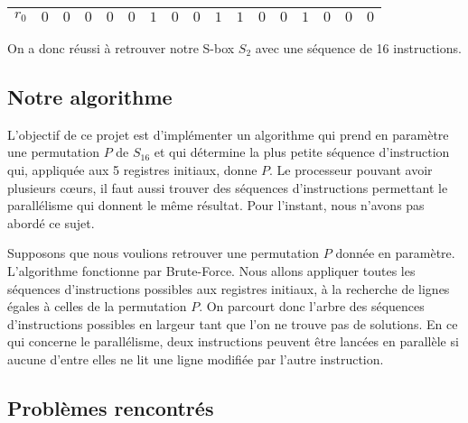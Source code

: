 \documentclass{article}
\begin{document}
\begin{center}
\begin{tabular}{|l|l|l|l|l|l|l|l|l|l|l|l|l|l|l|l|l|}
\hline
\multicolumn{1}{|l|}{ $r_{0}$}&	\multicolumn{1}{|l|}{ $0$}&	\multicolumn{1}{|l|}{ $0$}&	\multicolumn{1}{|l|}{ $0$}&	\multicolumn{1}{|l|}{ $0$}&	\multicolumn{1}{|l|}{ $0$}&	\multicolumn{1}{|l|}{ $1$}&	\multicolumn{1}{|l|}{ $0$}&	\multicolumn{1}{|l|}{ $0$}&	\multicolumn{1}{|l|}{ $1$}&	\multicolumn{1}{|l|}{ $1$}&	\multicolumn{1}{|l|}{ $0$}&	\multicolumn{1}{|l|}{ $0$}&	\multicolumn{1}{|l|}{ $1$}&	\multicolumn{1}{|l|}{ $0$}&	\multicolumn{1}{|l|}{ $0$}&	\multicolumn{1}{|l|}{ $0$}	\\
\hline
\end{tabular}

\end{center}
\medbreak
On a donc réussi à retrouver notre S-box $S_{2}$ avec une séquence de 16 instructions. 

\subsection{Notre algorithme}

L'objectif de ce projet est d'implémenter un algorithme qui prend en paramètre une permutation $P$ de $S_{16}$ et qui détermine la plus petite séquence d'instruction qui, appliquée aux 5 registres initiaux, donne $P$. Le processeur pouvant avoir plusieurs cœurs, il faut aussi trouver des séquences d'instructions permettant le parallélisme qui donnent le même résultat. Pour l'instant, nous n'avons pas abordé ce sujet.
       
Supposons que nous voulions retrouver une permutation $P$ donnée en paramètre. L'algorithme fonctionne par Brute-Force. Nous allons appliquer toutes les séquences d'instructions possibles aux registres initiaux, à la recherche de lignes égales à celles de la permutation $P$. On parcourt donc l'arbre des séquences d'instructions possibles en largeur tant que l'on ne trouve pas de solutions. En ce qui concerne le parallélisme, deux instructions peuvent être lancées en parallèle si aucune d'entre elles ne lit une ligne modifiée par l'autre instruction.

\subsection{Problèmes rencontrés}
\end{document}
